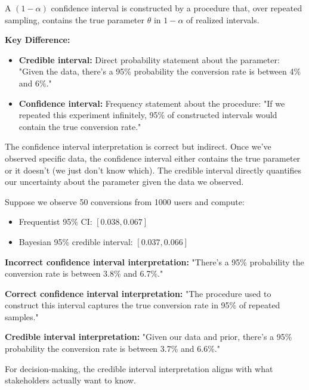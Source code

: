 \begin{definition}
A $(1-\alpha)$ confidence interval is constructed by a procedure that, over repeated sampling, contains the true parameter $\theta$ in $1-\alpha$ of realized intervals.
\end{definition}

\textbf{Key Difference:}
\begin{itemize}
    \item \textbf{Credible interval:} Direct probability statement about the parameter: "Given the data, there's a 95\% probability the conversion rate is between 4\% and 6\%."

    \item \textbf{Confidence interval:} Frequency statement about the procedure: "If we repeated this experiment infinitely, 95\% of constructed intervals would contain the true conversion rate."
\end{itemize}

The confidence interval interpretation is correct but indirect. Once we've observed specific data, the confidence interval either contains the true parameter or it doesn't (we just don't know which). The credible interval directly quantifies our uncertainty about the parameter given the data we observed.

\begin{example}
Suppose we observe 50 conversions from 1000 users and compute:
\begin{itemize}
    \item Frequentist 95\% CI: $[0.038, 0.067]$
    \item Bayesian 95\% credible interval: $[0.037, 0.066]$
\end{itemize}

\textbf{Incorrect confidence interval interpretation:} "There's a 95\% probability the conversion rate is between 3.8\% and 6.7\%."

\textbf{Correct confidence interval interpretation:} "The procedure used to construct this interval captures the true conversion rate in 95\% of repeated samples."

\textbf{Credible interval interpretation:} "Given our data and prior, there's a 95\% probability the conversion rate is between 3.7\% and 6.6\%."

For decision-making, the credible interval interpretation aligns with what stakeholders actually want to know.
\end{example}

